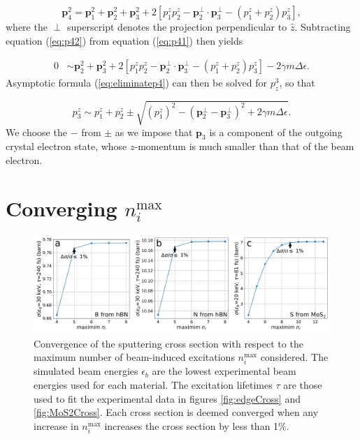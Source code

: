 \documentclass{article}
\begin{document}
\begin{equation}
  \mathbf{p}_4^2
  =
  \mathbf{p}_1^2 + \mathbf{p}_2^2 + \mathbf{p}_3^2
  + 2\left[
  p^z_1p^z_2 - \mathbf{p}^{\perp}_2 \cdot \mathbf{p}^{\perp}_3 
    - (p^z_1 + p^z_2)p^z_3
  \right],
  \label{eq:p42}
\end{equation}
%
where the $\perp$ superscript denotes the projection perpendicular to
$\hat{z}$.
Subtracting equation (\ref{eq:p42}) from equation (\ref{eq:p41}) then yields

\begin{equation}
\label{eq:eliminatep4}
\begin{aligned}
    0
    &\sim
    \mathbf{p}_2^2 + \mathbf{p}_3^2
    +
    2\left[
    p^z_1p^z_2 - \mathbf{p}^{\perp}_2 \cdot \mathbf{p}^{\perp}_3 - (p^z_1 + p^z_2)p^z_3
    \right]
    -
    2\gamma m\Delta\epsilon.
\end{aligned}
\end{equation}
%
Asymptotic formula (\ref{eq:eliminatep4}) can then be solved for $p^3_z$, so that

\begin{equation}
\label{eq:p3z}
    p_3^z
    \sim
    p_1^z + p_2^z
    \pm
    \sqrt{
    \left(p_1^z\right)^2
    -
    \left(\mathbf{p}_2^\perp - \mathbf{p}_3^\perp\right)^2
    +
    2\gamma m\Delta\epsilon
    }.
\end{equation}
%
We choose the $-$ from $\pm$ as we impose that $\mathbf{p}_3$ is a
component of the outgoing crystal electron state, whose $z$-momentum is much
smaller than that of the beam electron.

\pagebreak
\section{Converging $n_i^\text{max}$}
\label{app:nimax}

\begin{figure}[H]
  \centering
  \includegraphics[width=\textwidth]{figures/nimax.pdf}
  \caption{
    Convergence of the sputtering cross section with respect to the maximum
    number of beam-induced excitations $n_i^\text{max}$ considered.
    The simulated beam energies $\epsilon_b$ are the lowest experimental beam
    energies used for each material.
    The excitation lifetimes $\tau$ are those used to fit the experimental data
    in figures \ref{fig:edgeCross} and \ref{fig:MoS2Cross}.
    Each cross section is deemed converged when any increase in $n_i^\text{max}$
    increases the cross section by less than 1\%.
  }
  \label{fig:nimax}
\end{figure}
\end{document}
